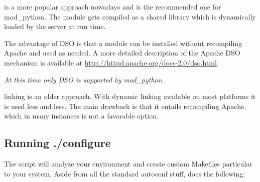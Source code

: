  is a more popular approach nowadays and is the recommended
one for mod_python. The module gets compiled as a shared library which
is dynamically loaded by the server at run time.

The advantage of DSO is that a module can be installed without
recompiling Apache and used as needed.  A more detailed description of
the Apache DSO mechanism is available at
\url{http://httpd.apache.org/docs-2.0/dso.html}.

\emph{At this time only DSO is supported by mod_python.}

 linking is an older approach. With dynamic linking
available on most platforms it is used less and less. The main
drawback is that it entails recompiling Apache, which in many
instances is not a favorable option.

\subsection{Running ./configure\label{inst-configure}}

The  script will analyze your environment and create custom
Makefiles particular to your system. Aside from all the standard
autoconf stuff,  does the following:

